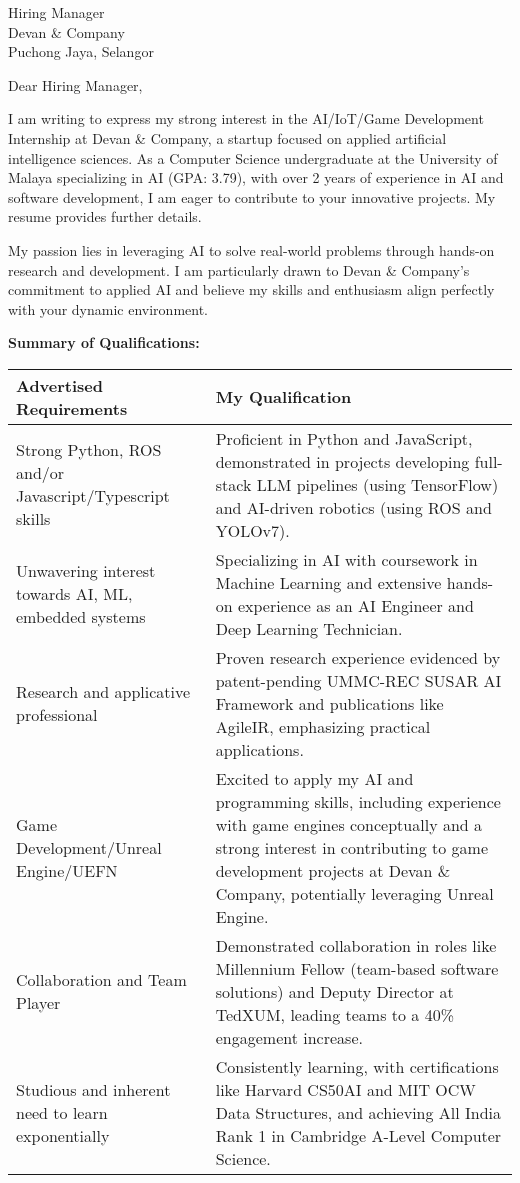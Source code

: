 \documentclass[10.5pt]{letter}
\date{\today}
\begin{document}
\begin{letter}{Hiring Manager\\Devan \& Company\\Puchong Jaya, Selangor}

\opening{Dear Hiring Manager,}

I am writing to express my strong interest in the AI/IoT/Game Development Internship at Devan \& Company, a startup focused on applied artificial intelligence sciences. As a Computer Science undergraduate at the University of Malaya specializing in AI (GPA: 3.79), with over 2 years of experience in AI and software development, I am eager to contribute to your innovative projects. My resume provides further details.

My passion lies in leveraging AI to solve real-world problems through hands-on research and development. I am particularly drawn to Devan \& Company's commitment to applied AI and believe my skills and enthusiasm align perfectly with your dynamic environment.

\vspace{0.3cm}
\textbf{Summary of Qualifications:}
\vspace{0.2cm}

\renewcommand{\arraystretch}{1.3}
\begin{tabularx}{\textwidth}{@{}p{}X@{}}
\textbf{Advertised Requirements} & \textbf{My Qualification} \\
\hline
Strong Python, ROS and/or Javascript/Typescript skills & Proficient in Python and JavaScript, demonstrated in projects developing full-stack LLM pipelines (using TensorFlow) and AI-driven robotics (using ROS and YOLOv7). \\
Unwavering interest towards AI, ML, embedded systems & Specializing in AI with coursework in Machine Learning and extensive hands-on experience as an AI Engineer and Deep Learning Technician. \\
Research and applicative professional & Proven research experience evidenced by patent-pending UMMC-REC SUSAR AI Framework and publications like AgileIR, emphasizing practical applications. \\
Game Development/Unreal Engine/UEFN &  Excited to apply my AI and programming skills, including experience with game engines conceptually and a strong interest in contributing to game development projects at Devan \& Company, potentially leveraging Unreal Engine.  \\
Collaboration and Team Player & Demonstrated collaboration in roles like Millennium Fellow (team-based software solutions) and Deputy Director at TedXUM, leading teams to a 40\% engagement increase. \\
Studious and inherent need to learn exponentially &  Consistently learning, with certifications like Harvard CS50AI and MIT OCW Data Structures, and achieving All India Rank 1 in Cambridge A-Level Computer Science. \\
\end{tabularx}


\end{letter}
\end{document}
